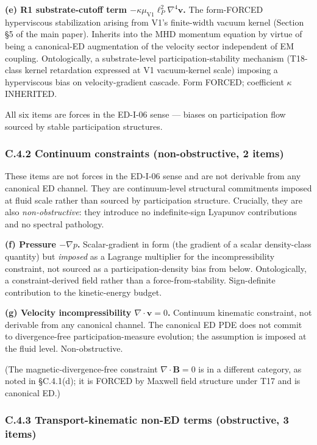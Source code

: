 \documentclass[
  11pt,a4paper]{article}
\begin{document}
\textbf{(e) R1 substrate-cutoff term
\(-\kappa\mu_\mathrm{V1}\ell_P^2\nabla^4\mathbf{v}\).} The form-FORCED
hyperviscous stabilization arising from V1's finite-width vacuum kernel
(Section §5 of the main paper). Inherits into the MHD momentum equation
by virtue of being a canonical-ED augmentation of the velocity sector
independent of EM coupling. Ontologically, a substrate-level
participation-stability mechanism (T18-class kernel retardation
expressed at V1 vacuum-kernel scale) imposing a hyperviscous bias on
velocity-gradient cascade. Form FORCED; coefficient \(\kappa\)
INHERITED.

All six items are forces in the ED-I-06 sense --- biases on
participation flow sourced by stable participation structures.

\subsubsection{C.4.2 Continuum constraints (non-obstructive, 2
items)}\label{c.4.2-continuum-constraints-non-obstructive-2-items}

These items are not forces in the ED-I-06 sense and are not derivable
from any canonical ED channel. They are continuum-level structural
commitments imposed at fluid scale rather than sourced by participation
structure. Crucially, they are also \emph{non-obstructive}: they
introduce no indefinite-sign Lyapunov contributions and no spectral
pathology.

\textbf{(f) Pressure \(-\nabla p\).} Scalar-gradient in form (the
gradient of a scalar density-class quantity) but \emph{imposed} as a
Lagrange multiplier for the incompressibility constraint, not sourced as
a participation-density bias from below. Ontologically, a
constraint-derived field rather than a force-from-stability.
Sign-definite contribution to the kinetic-energy budget.

\textbf{(g) Velocity incompressibility \(\nabla\cdot\mathbf{v} = 0\).}
Continuum kinematic constraint, not derivable from any canonical
channel. The canonical ED PDE does not commit to divergence-free
participation-measure evolution; the assumption is imposed at the fluid
level. Non-obstructive.

(The magnetic-divergence-free constraint \(\nabla\cdot\mathbf{B} = 0\)
is in a different category, as noted in §C.4.1(d); it is FORCED by
Maxwell field structure under T17 and is canonical ED.)

\subsubsection{C.4.3 Transport-kinematic non-ED terms (obstructive, 3
items)}\label{c.4.3-transport-kinematic-non-ed-terms-obstructive-3-items}
\end{document}
